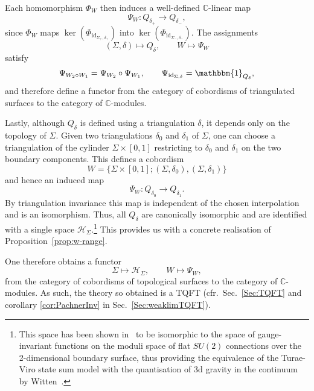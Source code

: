 \documentclass[11pt]{article}
\theoremstyle{definition}
\numberwithin{equation}{section}
\begin{document}
Each homomorphism $\Phi_W$ then induces a well-defined $\mathbb{C}$-linear map
\begin{equation}
\Psi_W:Q_{\delta_+}\to Q_{\delta_-},
\end{equation}
since $\Phi_W$ maps $\ker(\Phi_{\mathrm{id}_{\Sigma_+,\delta_+}})$ into $\ker(\Phi_{\mathrm{id}_{\Sigma_-,\delta_-}})$.
The assignments
\begin{equation}
(\Sigma,\delta)\mapsto Q_{\delta},
\qquad
W\mapsto\Psi_W
\end{equation}
satisfy
\begin{equation}
\Psi_{W_2\circ W_1}=\Psi_{W_2}\circ \Psi_{W_1},
\qquad
\Psi_{\mathrm{id}_{\Sigma,\delta}}=\mathbbm{1}_{Q_{\delta}},
\end{equation}
and therefore define a functor from the category of cobordisms of triangulated surfaces to the category of $\mathbb{C}$-modules.

Lastly, although $Q_{\delta}$ is defined using a triangulation $\delta$, it depends only on the topology of $\Sigma$. 
Given two triangulations $\delta_0$ and $\delta_1$ of $\Sigma$, one can choose a triangulation of the cylinder $\Sigma\times[0,1]$ restricting to $\delta_0$ and $\delta_1$ on the two boundary components. 
This defines a cobordism
\begin{equation}
W=\{\Sigma\times[0,1];(\Sigma,\delta_0),(\Sigma,\delta_1)\}
\end{equation}
and hence an induced map
\begin{equation}
\Psi_W:Q_{\delta_0}\to Q_{\delta_1}.
\end{equation}
By triangulation invariance this map is independent of the chosen interpolation and is an isomorphism. 
Thus, all $Q_{\delta}$ are canonically isomorphic and are identified with a single space $\mathcal H_\Sigma$.\footnote{This space has been shown in~\cite{Ooguri:1991ib, Ooguri_1992a} to be isomorphic to the space of gauge-invariant functions on the moduli space of flat $SU(2)$ connections over the 2-dimensional boundary surface, thus providing the equivalence of the Turae-Viro state sum model with the quantisation of 3d gravity in the continuum by Witten~\cite{Witten_1988b}.} 
This provides us with a concrete realisation of Proposition~\ref{prop:w-range}.

One therefore obtains a functor
\begin{equation}
\Sigma\longmapsto\mathcal H_\Sigma,
\qquad
W\longmapsto\Psi_W,
\end{equation}
from the category of cobordisms of topological surfaces to the category of $\mathbb{C}$-modules. As such, the theory so obtained is a TQFT (cfr.~Sec.~\ref{Sec:TQFT} and corollary \ref{cor:PachnerInv} in Sec.~\ref{Sec:weaklimTQFT}).
\end{document}
